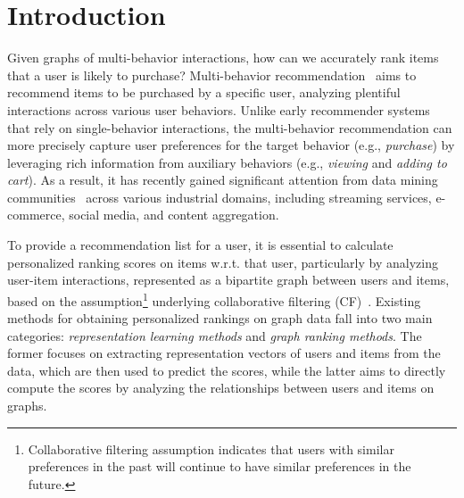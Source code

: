\section{Introduction}
\label{sec:introduction}
Given graphs of multi-behavior interactions, how can we accurately rank items that a user is likely to purchase?
Multi-behavior recommendation~\cite{LoniPLH16} aims to recommend items to be purchased by a specific user, analyzing plentiful interactions across various user behaviors. 
Unlike early recommender systems~\cite{KorenBV09,RendleRFGS12,HeHDWLZW20} that rely on single-behavior interactions, the multi-behavior recommendation can more precisely capture user preferences for the target behavior (e.g., \textit{purchase}) by leveraging rich information from auxiliary behaviors (e.g., \textit{viewing} and \textit{adding to cart}). 
As a result, it has recently gained significant attention from data mining communities~\cite{JinJGHJL20,LeeLKSJ24xxaw,LiLCYLLD24,GaoGHGCFLCJ19,ChengCHLZGP23fqvn,YanYCSSP23} across various industrial domains, including streaming services, e-commerce, social media, and content aggregation.

To provide a recommendation list for a user, it is essential to calculate personalized ranking scores on items w.r.t. that user, particularly by analyzing user-item interactions, represented as a bipartite graph between users and items, based on the assumption\footnote{Collaborative filtering assumption indicates that users with similar preferences in the past will continue to have similar preferences in the future.} underlying collaborative filtering (CF)~\cite{SchaferFHS07}.
Existing methods for obtaining personalized rankings on graph data fall into two main categories: 
\textit{representation learning methods} and \textit{graph ranking methods}.
The former focuses on extracting representation vectors of users and items from the data, which are then used to predict the scores, while the latter aims to directly compute the scores by analyzing the relationships between users and items on graphs.

